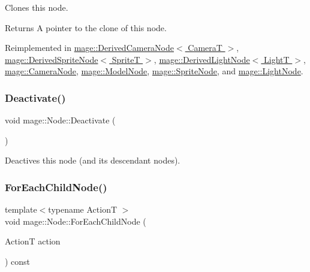 Clones this node.

\begin{DoxyReturn}{Returns}
A pointer to the clone of this node. 
\end{DoxyReturn}


Reimplemented in \hyperlink{classmage_1_1_derived_camera_node_aa965751029ebd6b41d3805b499a8304e}{mage\+::\+Derived\+Camera\+Node$<$ Camera\+T $>$}, \hyperlink{classmage_1_1_derived_sprite_node_ae1aa2b80d4ff8688635df017826c11a5}{mage\+::\+Derived\+Sprite\+Node$<$ Sprite\+T $>$}, \hyperlink{classmage_1_1_derived_light_node_acf8858989780bf45a45c55a7c5564314}{mage\+::\+Derived\+Light\+Node$<$ Light\+T $>$}, \hyperlink{classmage_1_1_camera_node_a002d3a2b41cda270a26ca5d8f3a17f55}{mage\+::\+Camera\+Node}, \hyperlink{classmage_1_1_model_node_a34146201083015276b38240af307417f}{mage\+::\+Model\+Node}, \hyperlink{classmage_1_1_sprite_node_a83a2a865b38670d64491a1066895e218}{mage\+::\+Sprite\+Node}, and \hyperlink{classmage_1_1_light_node_aea97601d0a4b8073a1c655ca334af242}{mage\+::\+Light\+Node}.

\hypertarget{classmage_1_1_node_afb4de0bc346a435745facfbdeda4ac6a}{}\label{classmage_1_1_node_afb4de0bc346a435745facfbdeda4ac6a} 
\subsubsection{\texorpdfstring{Deactivate()}{Deactivate()}}
{\footnotesize\ttfamily void mage\+::\+Node\+::\+Deactivate (\begin{DoxyParamCaption}{ }\end{DoxyParamCaption})\hspace{0.3cm}{\ttfamily [noexcept]}}

Deactives this node (and its descendant nodes). \hypertarget{classmage_1_1_node_afedb523a462952ec29aed7504d0a71d4}{}\label{classmage_1_1_node_afedb523a462952ec29aed7504d0a71d4} 
\subsubsection{\texorpdfstring{For\+Each\+Child\+Node()}{ForEachChildNode()}}
{\footnotesize\ttfamily template$<$typename ActionT $>$ \\
void mage\+::\+Node\+::\+For\+Each\+Child\+Node (\begin{DoxyParamCaption}\item[{ActionT}]{action }\end{DoxyParamCaption}) const}


